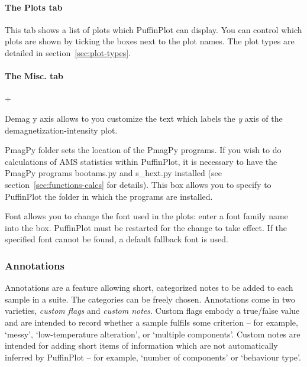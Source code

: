 \documentclass[a4paper,british]{article}
\newcommand{\menuitemlabel}[1]{%
\mbox{\textsf{#1}}\hfil}
\newenvironment{menuitemlist}%
{\begin{list}{}{%
\renewcommand{\makelabel}{\menuitemlabel}%
\setlength{\labelwidth}{35pt}%
\setlength{\leftmargin}%
             {\labelwidth+\labelsep}}}%
{\end{list}}
\newcommand{\ppcmd}[1]{\textsf{#1}} %
\newcommand{\caps}[1]{\MakeTextUppercase{#1}} %
\newcommand{\quot}[1]{`#1'}
\begin{document}
\paragraph{The \ppcmd{Plots} tab}

This tab shows a list of plots which PuffinPlot can display. You can control
which plots are shown by ticking the boxes next to the plot names. The plot
types are detailed in section~\ref{sec:plot-types}.

\paragraph{The \ppcmd{Misc.} tab}

\begin{menuitemlist}

\item[Demag y axis] allows to you customize the text which labels the {\em y}
  axis of the demagnetization-intensity plot.

\item[PmagPy folder] sets the location of the PmagPy programs. If you wish to
  do calculations of \caps{ams} statistics within PuffinPlot, it is necessary
  to have the PmagPy programs \ppcmd{bootams.py} and \ppcmd{s\_hext.py}
  installed (see section~\ref{sec:functions-calcs} for details). This
  box allows you to specify to PuffinPlot the folder in which the programs
  are installed.

\item[Font] allows you to change the font used in the plots: enter a font
  family name into the box. PuffinPlot must be restarted for the change to
  take effect. If the specified font cannot be found, a default fallback font
  is used.

\end{menuitemlist}

\subsubsection{\label{sec:annotations}Annotations}

Annotations are a feature allowing short, categorized notes to be added to
each sample in a suite. The categories can be freely chosen. Annotations come
in two varieties, {\em custom flags} and {\em custom notes}. Custom flags
embody a true/false value and are intended to record whether a sample fulfils
some criterion -- for example, \quot{messy}, \quot{low-temperature
  alteration}, or \quot{multiple components}. Custom notes are intended for
adding short items of information which are not automatically inferred by
PuffinPlot -- for example, \quot{number of components} or \quot{behaviour
  type}.
\end{document}
